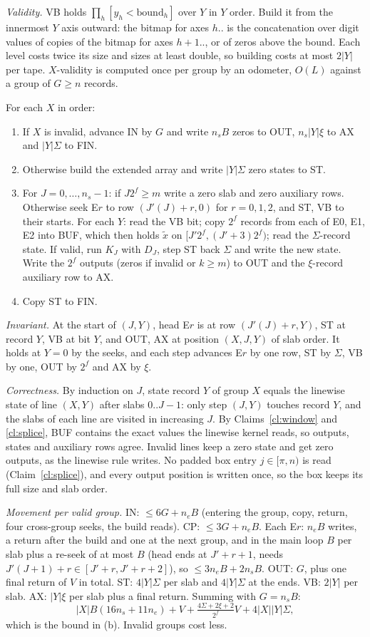 \documentclass[11pt]{article}
\theoremstyle{definition}\newtheorem{definition}{Definition}
\theoremstyle{remark}\newtheorem*{remark}{Remark}
\begin{document}
\emph{Validity.} VB holds $\prod_h[y_h<\text{bound}_h]$ over $Y$ in $Y$ order. Build it from the
innermost $Y$ axis outward: the bitmap for axes $h..$ is the concatenation over digit values of
copies of the bitmap for axes $h+1..$, or of zeros above the bound. Each level costs twice its
size and sizes at least double, so building costs at most $2|Y|$ per tape. $X$-validity is
computed once per group by an odometer, $O(L)$ against a group of $G\ge n$ records.

For each $X$ in order:
\begin{enumerate}
\item If $X$ is invalid, advance IN by $G$ and write $n_sB$ zeros to OUT, $n_s|Y|\xi$ to AX and
$|Y|\Sigma$ to FIN.
\item Otherwise build the extended array and write $|Y|\Sigma$ zero states to ST.
\item For $J=0,\dots,n_s-1$: if $J2^f\ge m$ write a zero slab and zero auxiliary rows. Otherwise
seek E$r$ to row $(J'(J)+r,0)$ for $r=0,1,2$, and ST, VB to their starts. For each $Y$:
read the VB bit; copy $2^f$ records from each of E0, E1, E2 into BUF, which then holds
$\tilde x$ on $[J'2^f,(J'+3)2^f)$; read the $\Sigma$-record state. If valid, run $K_J$ with
$D_J$, step ST back $\Sigma$ and write the new state. Write the $2^f$ outputs (zeros if invalid
or $k\ge m$) to OUT and the $\xi$-record auxiliary row to AX.
\item Copy ST to FIN.
\end{enumerate}

\emph{Invariant.} At the start of $(J,Y)$, head E$r$ is at row $(J'(J)+r,Y)$, ST at record $Y$,
VB at bit $Y$, and OUT, AX at position $(X,J,Y)$ of slab order. It holds at $Y=0$ by the seeks,
and each step advances E$r$ by one row, ST by $\Sigma$, VB by one, OUT by $2^f$ and AX by $\xi$.

\emph{Correctness.} By induction on $J$, state record $Y$ of group $X$ equals the linewise
state of line $(X,Y)$ after slabs $0..J-1$: only step $(J,Y)$ touches record $Y$, and the slabs
of each line are visited in increasing $J$. By Claims~\ref{cl:window} and \ref{cl:splice}, BUF
contains the exact values the linewise kernel reads, so outputs, states and auxiliary rows
agree. Invalid lines keep a zero state and get zero outputs, as the linewise rule writes. No
padded box entry $j\in[\pi,n)$ is read (Claim~\ref{cl:splice}), and every output position is
written once, so the box keeps its full size and slab order.

\emph{Movement per valid group.} IN: $\le6G+n_eB$ (entering the group, copy, return, four
cross-group seeks, the build reads). CP: $\le3G+n_eB$. Each E$r$: $n_eB$ writes, a return
after the build and one at the next group, and in the main loop $B$ per slab plus a re-seek of
at most $B$ (head ends at $J'+r+1$, needs $J'(J+1)+r\in[J'+r,J'+r+2]$), so $\le3n_eB+2n_sB$.
OUT: $G$, plus one final return of $V$ in total. ST: $4|Y|\Sigma$ per slab and $4|Y|\Sigma$ at
the ends. VB: $2|Y|$ per slab. AX: $|Y|\xi$ per slab plus a final return. Summing with
$G=n_sB$:
\[
 |X|B(16n_s+11n_e)+V+\tfrac{4\Sigma+2\xi+2}{2^f}V+4|X||Y|\Sigma ,
\]
which is the bound in (b). Invalid groups cost less.
\end{document}
